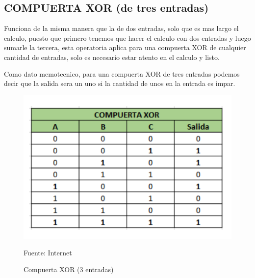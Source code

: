 \subsection{COMPUERTA XOR (de tres entradas)}
Funciona de la misma manera que la de dos entradas, solo que es mas largo el calculo, puesto que primero tenemos que hacer el calculo con dos entradas y luego sumarle la tercera, esta operatoria aplica para una compuerta XOR de cualquier cantidad de entradas, solo es necesario estar atento en el calculo y listo.

Como dato memotecnico, para una compuerta XOR de tres entradas podemos decir que la salida sera un uno si la cantidad de unos en la entrada es impar.

\begin{figure}[H]
    \centering
    \includegraphics[scale = 0.7]{Imagenes/XOR3.png}
    \caption{Compuerta XOR (3 entradas)}{Fuente: Internet}
\end{figure}



